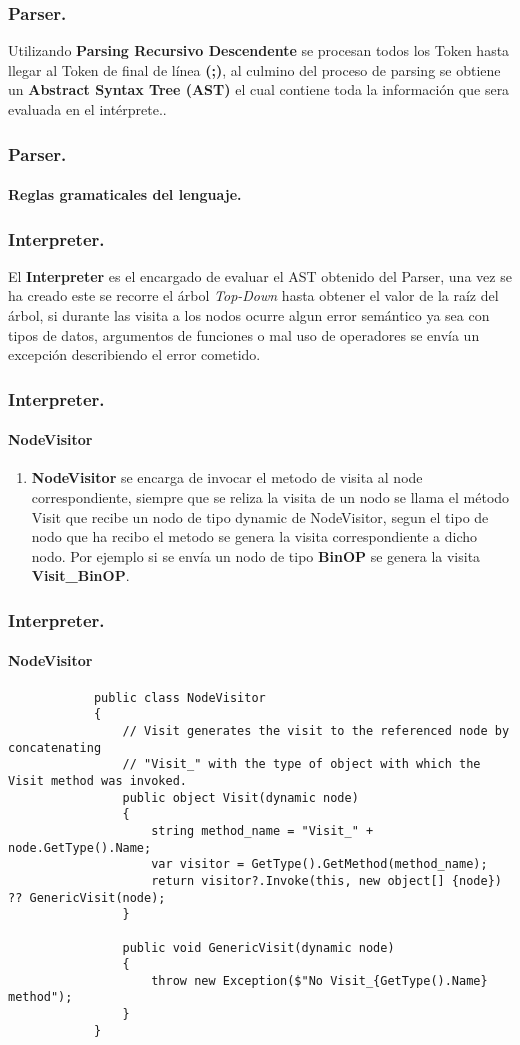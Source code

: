 \documentclass[12pt]{beamer}
\begin{document}
	\begin{frame}[fragile]
		\frametitle{Parser.}
		Utilizando \textbf{Parsing Recursivo Descendente} se procesan todos los Token hasta llegar al Token de final de línea \textbf{(;)}, al culmino del proceso de parsing se obtiene un \textbf{Abstract Syntax Tree (AST)} el cual contiene toda la información que sera evaluada en el intérprete..
	\end{frame}
	
	\begin{frame}[fragile]
		\frametitle{Parser.}
		\framesubtitle{Reglas gramaticales del lenguaje.}
	\end{frame}
	
	\begin{frame}[fragile]
		\frametitle{Interpreter.}
		El \textbf{Interpreter} es el encargado de evaluar el AST obtenido del Parser, una vez se ha creado este se recorre el árbol \emph{Top-Down} hasta obtener el valor de la raíz del árbol, si durante las visita a los nodos ocurre algun error semántico ya sea con tipos de datos, argumentos de funciones o mal uso de operadores se envía un excepción describiendo el error cometido.
	\end{frame}
	
	\begin{frame}[fragile]
		\frametitle{Interpreter.}
		\framesubtitle{NodeVisitor}
		
		\begin{enumerate}
			\item \textbf{NodeVisitor} se encarga de invocar el metodo de visita al node correspondiente, siempre que se reliza la visita de un nodo se llama el método Visit que recibe un nodo de tipo dynamic de NodeVisitor, segun el tipo de nodo que ha recibo el metodo se genera la visita correspondiente a dicho nodo. Por ejemplo si se envía un nodo de tipo \textbf{BinOP} se genera la visita \textbf{Visit\_BinOP}.
		\end{enumerate}
	\end{frame}
	
	\begin{frame}[fragile]
		\frametitle{Interpreter.}
		\framesubtitle{NodeVisitor}
			\begin{lstlisting}
			public class NodeVisitor
			{
				// Visit generates the visit to the referenced node by concatenating 
				// "Visit_" with the type of object with which the Visit method was invoked.
				public object Visit(dynamic node)
				{
					string method_name = "Visit_" + node.GetType().Name;
					var visitor = GetType().GetMethod(method_name);
					return visitor?.Invoke(this, new object[] {node}) ?? GenericVisit(node);
				}
			
				public void GenericVisit(dynamic node)
				{
					throw new Exception($"No Visit_{GetType().Name} method");
				}
			}
			\end{lstlisting}
	\end{frame}
	
\end{document}
